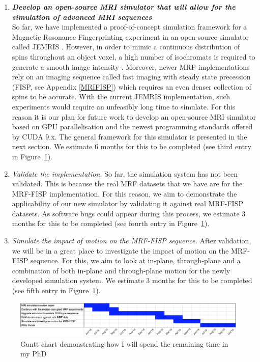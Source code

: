 \begin{enumerate}
	\item \textit{\textbf{Develop an open-source MRI simulator that will allow for the simulation of advanced MRI sequences}} \\
	So far, we have implemented a proof-of-concept simulation framework for a Magnetic Resonance Fingerprinting experiment in an open-source simulator called JEMRIS \cite{Stocker2010}.
	However, in order to mimic a continuous distribution of spins throughout an object voxel, a high number of isochromats is required to generate a smooth image intensity \cite{Shkarin1997}.
	Moreover, newer MRF implementations rely on an imaging sequence called fast imaging with steady state precession (FISP, see Appendix \ref{MRIFISP}) which requires an even denser collection of spins to be accurate.
	With the current JEMRIS implementation, such experiments would require an unfeasibly long time to simulate.
	For this reason it is our plan for future work to develop an open-source MRI simulator based on GPU parallelisation and the newest programming standards offered by CUDA 9.x.
	The general framework for this simulator is presented in the next section.
	We estimate 6 months for this to be completed (see third entry in Figure~\ref{fig:ganttChart}). 
	\item \textit{Validate the implementation.}
	So far, the simulation system has not been validated.
	This is because the real MRF datasets that we have are for the MRF-FISP implementation.
	For this reason, we aim to demonstrate the applicability of our new simulator by validating it against real MRF-FISP datasets.
	As software bugs could appear during this process, we estimate 3 months for this to be completed (see fourth entry in Figure~\ref{fig:ganttChart}).
	
	\item \textit{Simulate the impact of motion on the MRF-FISP sequence.}
	After validation, we will be in a great place to investigate the impact of motion on the MRF-FISP sequence.
	For this, we aim to look at in-plane, through-plane and a combination of both in-plane and through-plane motion for the newly developed simulation system.
	We estimate 3 months for this to be completed (see fifth entry in Figure~\ref{fig:ganttChart}).
	
\end{enumerate}

\begin{figure}[ht]
    \centering
    \includegraphics[width=1\textwidth, keepaspectratio]{images/mri/ganttChart}
    \caption{Gantt chart demonstrating how I will spend the remaining time in my PhD}
    \label{fig:ganttChart}
\end{figure}
